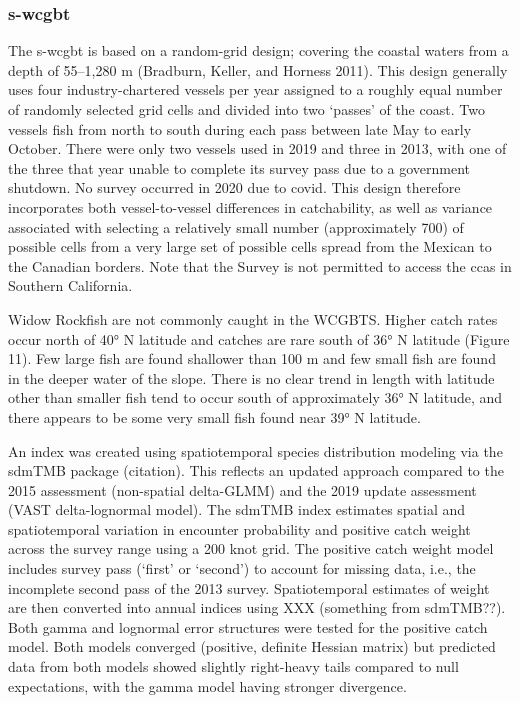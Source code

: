 \documentclass[
]{scrartcl}
\begin{document}
\subsubsection{\texorpdfstring{\acrlong{s-wcgbt}}{}}\label{section-1}

The \gls{s-wcgbt} is based on a random-grid design; covering the coastal
waters from a depth of 55--1,280 m (Bradburn, Keller, and Horness 2011).
This design generally uses four industry-chartered vessels per year
assigned to a roughly equal number of randomly selected grid cells and
divided into two `passes' of the coast. Two vessels fish from north to
south during each pass between late May to early October. There were
only two vessels used in 2019 and three in 2013, with one of the three
that year unable to complete its survey pass due to a government
shutdown. No survey occurred in 2020 due to \gls{covid}. This design
therefore incorporates both vessel-to-vessel differences in
catchability, as well as variance associated with selecting a relatively
small number (approximately 700) of possible cells from a very large set
of possible cells spread from the Mexican to the Canadian borders. Note
that the Survey is not permitted to access the \glspl{cca} in Southern
California.

Widow Rockfish are not commonly caught in the WCGBTS. Higher catch rates
occur north of 40° N latitude and catches are rare south of 36° N
latitude (Figure 11). Few large fish are found shallower than 100 m and
few small fish are found in the deeper water of the slope. There is no
clear trend in length with latitude other than smaller fish tend to
occur south of approximately 36° N latitude, and there appears to be
some very small fish found near 39° N latitude.

An index was created using spatiotemporal species distribution modeling
via the sdmTMB package (citation). This reflects an updated approach
compared to the 2015 assessment (non-spatial delta-GLMM) and the 2019
update assessment (VAST delta-lognormal model). The sdmTMB index
estimates spatial and spatiotemporal variation in encounter probability
and positive catch weight across the survey range using a 200 knot grid.
The positive catch weight model includes survey pass (`first' or
`second') to account for missing data, i.e., the incomplete second pass
of the 2013 survey. Spatiotemporal estimates of weight are then
converted into annual indices using XXX (something from sdmTMB??). Both
gamma and lognormal error structures were tested for the positive catch
model. Both models converged (positive, definite Hessian matrix) but
predicted data from both models showed slightly right-heavy tails
compared to null expectations, with the gamma model having stronger
divergence.
\end{document}
